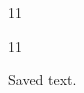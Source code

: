 \documentclass[paper=A4]{ropas-poster}
\begin{document}
\begin{postergrid}{1}{1}
\begin{posterblock}{1}{1}
\begin{lrbox}{\savedTestBox}Saved text.\end{lrbox}\usebox{\savedTestBox}
\end{posterblock}
\end{postergrid}
\end{document}
